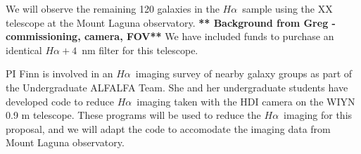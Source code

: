 \documentclass[11pt, preprint]{aastex}
\newcommand{\ha}{$H\alpha$}
\begin{document}
We will observe the remaining 120 galaxies in the \ha \ sample using the
XX telescope at the Mount Laguna observatory.  
{\bf *** Background from Greg - commissioning, camera, FOV**}
We have included funds to purchase an identical 
$H\alpha+4$~nm filter for this telescope.  


PI Finn is involved in an \ha \ imaging survey of nearby galaxy groups
as part of the Undergraduate ALFALFA Team.  She and her undergraduate
students have developed code to reduce \ha \ imaging taken with the HDI camera on
the WIYN 0.9 m telescope.  These programs will be used to reduce the
\ha \ imaging for this proposal, and we will adapt the code to
accomodate the imaging data from Mount Laguna observatory.

\end{document}

